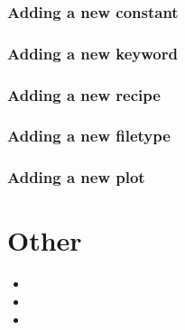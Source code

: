 \documentclass[a4paper,10pt,english]{report}
\begin{document}
\subsection{Adding a new constant}
\label{\detokenize{dev/adding_new_constant:adding-a-new-constant}}\label{\detokenize{dev/adding_new_constant:add-new-constant}}\label{\detokenize{dev/adding_new_constant::doc}}

\subsection{Adding a new keyword}
\label{\detokenize{dev/adding_new_keyword:adding-a-new-keyword}}\label{\detokenize{dev/adding_new_keyword:adding-new-keyword}}\label{\detokenize{dev/adding_new_keyword::doc}}

\subsection{Adding a new recipe}
\label{\detokenize{dev/adding_new_recipe:adding-a-new-recipe}}\label{\detokenize{dev/adding_new_recipe:add-new-recipe}}\label{\detokenize{dev/adding_new_recipe::doc}}

\subsection{Adding a new filetype}
\label{\detokenize{dev/adding_new_filetype:adding-a-new-filetype}}\label{\detokenize{dev/adding_new_filetype:add-new-filetype}}\label{\detokenize{dev/adding_new_filetype::doc}}

\subsection{Adding a new plot}
\label{\detokenize{dev/adding_new_plot:adding-a-new-plot}}\label{\detokenize{dev/adding_new_plot:add-new-plot}}\label{\detokenize{dev/adding_new_plot::doc}}

\chapter{Other}
\label{\detokenize{index:other}}\begin{itemize}
\item {} 

\item {} 

\item {} 

\end{itemize}
\end{document}
